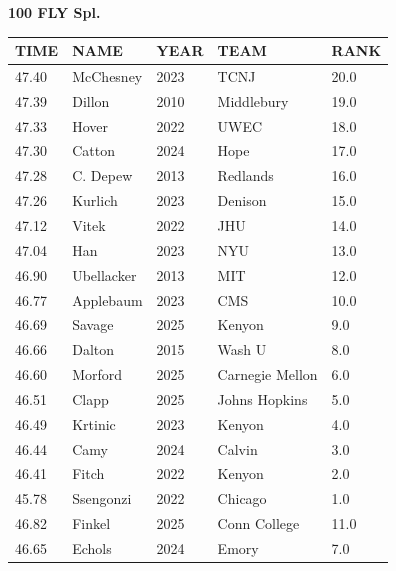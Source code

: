 \begin{table}[H]
\centering
\begin{minipage}[t]{0.6\textwidth}
\centering
\textbf{100 FLY Spl.}\\[0.1cm]
\begin{tabular}{@{}p{1.8cm}p{2.8cm}p{1.2cm}p{1.4cm}p{0.8cm}@{}}
\hline
    \textbf{TIME} & \textbf{NAME} & \textbf{YEAR} & \textbf{TEAM} & \textbf{RANK} \\
\hline
    47.40 & McChesney & 2023 & TCNJ & 20.0 \\
    47.39 & Dillon & 2010 & Middlebury & 19.0 \\
    47.33 & Hover & 2022 & UWEC & 18.0 \\
    47.30 & Catton & 2024 & Hope & 17.0 \\
    47.28 & C. Depew & 2013 & Redlands & 16.0 \\
    47.26 & Kurlich & 2023 & Denison & 15.0 \\
    47.12 & Vitek & 2022 & JHU & 14.0 \\
    47.04 & Han & 2023 & NYU & 13.0 \\
    46.90 & Ubellacker & 2013 & MIT & 12.0 \\
    46.77 & Applebaum & 2023 & CMS & 10.0 \\
    46.69 & Savage & 2025 & Kenyon & 9.0 \\
    46.66 & Dalton & 2015 & Wash U & 8.0 \\
    46.60 & Morford & 2025 & Carnegie Mellon & 6.0 \\
    46.51 & Clapp & 2025 & Johns Hopkins & 5.0 \\
    46.49 & Krtinic & 2023 & Kenyon & 4.0 \\
    46.44 & Camy & 2024 & Calvin & 3.0 \\
    46.41 & Fitch & 2022 & Kenyon & 2.0 \\
    45.78 & Ssengonzi & 2022 & Chicago & 1.0 \\
    46.82 & Finkel & 2025 & Conn College & 11.0 \\
    46.65 & Echols & 2024 & Emory & 7.0 \\
\hline
\end{tabular}
\end{minipage}
\end{table}


\newpage

